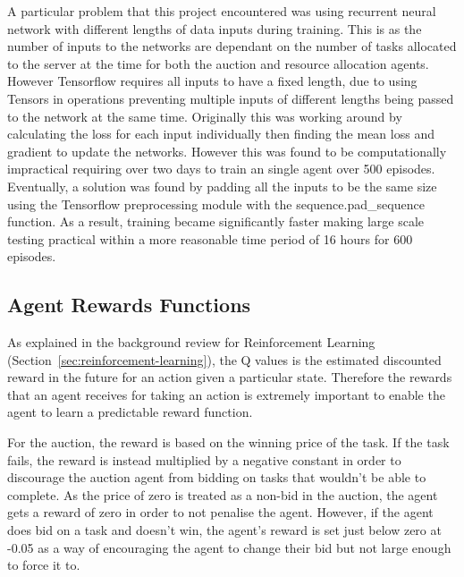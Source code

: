 A particular problem that this project encountered was using recurrent neural network with different lengths of data
inputs during training. This is as the number of inputs to the networks are dependant on the number of tasks allocated
to the server at the time for both the auction and resource allocation agents. However Tensorflow requires all inputs to
have a fixed length, due to using Tensors in operations preventing multiple inputs of different lengths being passed to
the network at the same time.  Originally this was working around by calculating the loss for each input individually
then finding the mean loss and gradient to update the networks. However this was found to be computationally impractical
requiring over two days to train an single agent over 500 episodes. Eventually, a solution was found by padding all the
inputs to be the same size using the Tensorflow preprocessing module with the sequence.pad\_sequence function. As a
result, training became significantly faster making large scale testing practical within a more reasonable time period
of 16 hours for 600 episodes.

\subsection{Agent Rewards Functions}
\label{subsec:agent-rewards-functions}
As explained in the background review for Reinforcement Learning (Section~\ref{sec:reinforcement-learning}),
the Q values is the estimated discounted reward in the future for an action given a particular state. Therefore the
rewards that an agent receives for taking an action is extremely important to enable the agent to learn a predictable
reward function.

For the auction, the reward is based on the winning price of the task. If the
task fails, the reward is instead multiplied by a negative constant in order to discourage the auction agent from
bidding on tasks that wouldn't be able to complete. As the price of zero is treated as a non-bid in the auction, the
agent gets a reward of zero in order to not penalise the agent. However, if the agent does bid on a task and
doesn't win, the agent's reward is set just below zero at -0.05 as a way of encouraging the agent to change their bid
but not large enough to force it to.

